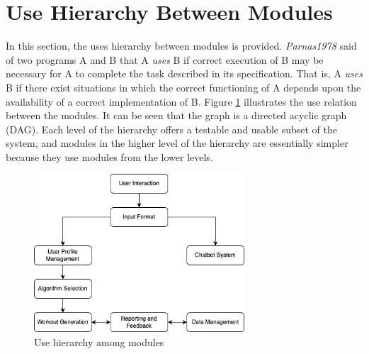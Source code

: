 \documentclass[12pt, titlepage]{article}
\begin{document}
\section{Use Hierarchy Between Modules} \label{SecUse}

In this section, the uses hierarchy between modules is
provided. \textit{Parnas1978} said of two programs A and B that A {\em uses} B if
correct execution of B may be necessary for A to complete the task described in
its specification. That is, A {\em uses} B if there exist situations in which
the correct functioning of A depends upon the availability of a correct
implementation of B.  Figure \ref{FigUH} illustrates the use relation between
the modules. It can be seen that the graph is a directed acyclic graph
(DAG). Each level of the hierarchy offers a testable and usable subset of the
system, and modules in the higher level of the hierarchy are essentially simpler
because they use modules from the lower levels.

\begin{figure}[H]
\centering
\includegraphics[width=0.7\textwidth]{docs/design/SoftArchitecture/UseHierarchyModules.png}
\caption{Use hierarchy among modules}
\label{FigUH}
\end{figure}


%

\newpage{}
\end{document}
